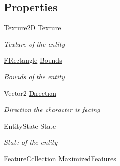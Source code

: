 \subsection*{Properties}
\begin{DoxyCompactItemize}
\item 
Texture2\+D \hyperlink{class_hel_project_1_1_game_world_1_1_entities_1_1_h_entity_a11ba8f188ffd338f024d396ab0b27cbb}{Texture}
\begin{DoxyCompactList}\small\item\em Texture of the entity \end{DoxyCompactList}\item 
\hyperlink{class_hel_project_1_1_tools_1_1_f_rectangle}{F\+Rectangle} \hyperlink{class_hel_project_1_1_game_world_1_1_entities_1_1_h_entity_a2f205d2e351dadd9c7e4bcfc9b06b970}{Bounds}
\begin{DoxyCompactList}\small\item\em Bounds of the entity \end{DoxyCompactList}\item 
Vector2 \hyperlink{class_hel_project_1_1_game_world_1_1_entities_1_1_h_entity_af5174b1052e65a73b16a4b9530474ce5}{Direction}
\begin{DoxyCompactList}\small\item\em Direction the character is facing \end{DoxyCompactList}\item 
\hyperlink{class_hel_project_1_1_game_world_1_1_entities_1_1_h_entity_af0044d8a58b65254f673f8c0ecfecdea}{Entity\+State} \hyperlink{class_hel_project_1_1_game_world_1_1_entities_1_1_h_entity_a2e904ad6fe707cadd501a423e4768a0d}{State}
\begin{DoxyCompactList}\small\item\em State of the entity \end{DoxyCompactList}\item 
\hyperlink{class_hel_project_1_1_features_1_1_feature_collection}{Feature\+Collection} \hyperlink{class_hel_project_1_1_game_world_1_1_entities_1_1_h_entity_afb7fd74a8073bf8311bceba415e6022c}{Maximized\+Features}

\end{DoxyCompactItemize}
